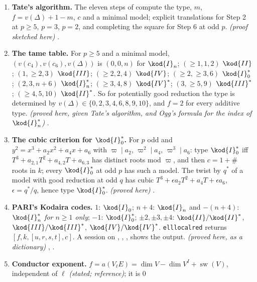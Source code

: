 \begin{enumerate}[label=\textbf{\thechapter.\arabic*}]
$(\Z/2)^2$ ($n$ even); $\kod{IV}^*$: $7$, $\Z/3$; $\kod{III}^*$: $8$, $\Z/2$; $\kod{II}^*$: $9$, $0$. Possible $c$: $\kod{IV},\kod{IV}^*$: $1,3$;
$\kod{I}_0^*$: $1,2,4$; $\kod{I}_n^*$: $2,4$; $\kod{III},\kod{III}^*$: $2$; $\kod{II},\kod{II}^*$: $1$. \emph{(stated; reference)}
.
\item \textbf{Tate's algorithm.} The eleven steps of  compute the type, $m$, $f=v(\Delta)+1-m$, $c$ and a
minimal model; explicit translations for Step 2 at $p\ge5$, $p=3$, $p=2$, and completing the square for Step 6 at odd $p$. \emph{(proof
sketched here)} .
\item \textbf{The tame table.} For $p\ge5$ and a minimal model, $(v(c_4),v(c_6),v(\Delta))$ is $(0,0,n)$ for $\kod{I}_n$; $(\ge1,1,2)$ $\kod{II}$;
$(1,\ge2,3)$ $\kod{III}$; $(\ge2,2,4)$ $\kod{IV}$; $(\ge2,\ge3,6)$ $\kod{I}_0^*$; $(2,3,n+6)$ $\kod{I}_n^*$; $(\ge3,4,8)$ $\kod{IV}^*$; $(3,\ge5,9)$ $\kod{III}^*$;
$(\ge4,5,10)$ $\kod{II}^*$. So for potentially good reduction the type is determined by $v(\Delta)\in\{0,2,3,4,6,8,9,10\}$, and $f=2$ for every
additive type. \emph{(proved here, given Tate's algorithm, and Ogg's formula for the index of $\kod{I}_n^*$)} .
\item \textbf{The cubic criterion for $\kod{I}_0^*$.} For $p$ odd and $y^2=x^3+a_2x^2+a_4x+a_6$ with $\varpi\mid a_2$, $\varpi^2\mid a_4$, $\varpi^3\mid a_6$:
type $\kod{I}_0^*$ iff $T^3+a_{2,1}T^2+a_{4,2}T+a_{6,3}$ has distinct roots mod $\varpi$, and then $c=1+\#$roots in $k$; every $\kod{I}_0^*$ at odd
$p$ has such a model. The twist by $q^*$ of a model with good reduction at odd $q$ has cubic $T^3+\epsilon a_2T^2+a_4T+\epsilon a_6$,
$\epsilon=q^*/q$, hence type $\kod{I}_0^*$. \emph{(proved here)} .
\item \textbf{PARI's Kodaira codes.} $1$: $\kod{I}_0$; $n+4$: $\kod{I}_n$ and $-(n+4)$: $\kod{I}_n^*$ \emph{for $n\ge1$ only}; $-1$: $\kod{I}_0^*$;
$\pm2,\pm3,\pm4$: $\kod{II}/\kod{II}^*$, $\kod{III}/\kod{III}^*$, $\kod{IV}/\kod{IV}^*$. \texttt{elllocalred} returns $[f,k,[u,r,s,t],c]$.
A session on , , ,  shows the output. \emph{(proved here, as a dictionary)}
, .
\item \textbf{Conductor exponent.} $f=a(V_\ell E)=\dim V-\dim V^{I}+\operatorname{sw}(V)$, independent of $\ell$ \emph{(stated; reference)}; it is $0$

\end{enumerate}
